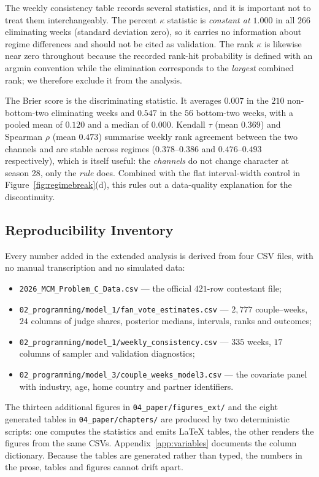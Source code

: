 The weekly consistency table records several statistics, and it is important not to treat them
interchangeably. The percent $\kappa$ statistic is \emph{constant at $1.000$} in all $266$
eliminating weeks (standard deviation zero), so it carries no information about regime
differences and should not be cited as validation. The rank $\kappa$ is likewise near zero
throughout because the recorded rank-hit probability is defined with an argmin convention
while the elimination corresponds to the \emph{largest} combined rank; we therefore exclude it
from the analysis.

The Brier score is the discriminating statistic. It averages $0.007$ in the $210$
non-bottom-two eliminating weeks and $0.547$ in the $56$ bottom-two weeks, with a pooled mean
of $0.120$ and a median of $0.000$. Kendall $\tau$ (mean $0.369$) and Spearman $\rho$ (mean
$0.473$) summarise weekly rank agreement between the two channels and are stable across
regimes ($0.378$--$0.386$ and $0.476$--$0.493$ respectively), which is itself useful: the
\emph{channels} do not change character at season 28, only the \emph{rule} does. Combined with
the flat interval-width control in Figure~\ref{fig:regimebreak}(d), this rules out a
data-quality explanation for the discontinuity.

\subsection{Reproducibility Inventory}\label{sec:reproducibility}

Every number added in the extended analysis is derived from four CSV files, with no manual
transcription and no simulated data:

\begin{itemize}
  \item \texttt{2026\_MCM\_Problem\_C\_Data.csv} --- the official $421$-row contestant file;
  \item \texttt{02\_programming/model\_1/fan\_vote\_estimates.csv} --- $2{,}777$ couple--weeks,
        $24$ columns of judge shares, posterior medians, intervals, ranks and outcomes;
  \item \texttt{02\_programming/model\_1/weekly\_consistency.csv} --- $335$ weeks, $17$
        columns of sampler and validation diagnostics;
  \item \texttt{02\_programming/model\_3/couple\_weeks\_model3.csv} --- the covariate panel
        with industry, age, home country and partner identifiers.
\end{itemize}

The thirteen additional figures in \texttt{04\_paper/figures\_ext/} and the eight generated
tables in \texttt{04\_paper/chapters/} are produced by two deterministic scripts: one computes
the statistics and emits LaTeX tables, the other renders the figures from the same CSVs.
Appendix~\ref{app:variables} documents the column dictionary. Because the tables are generated
rather than typed, the numbers in the prose, tables and figures cannot drift apart.

